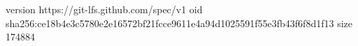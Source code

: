 version https://git-lfs.github.com/spec/v1
oid sha256:ce18b4e3c5780e2e16572bf21fcce9611e4a94d1025591f55e3fb43f6f8d1f13
size 174884

